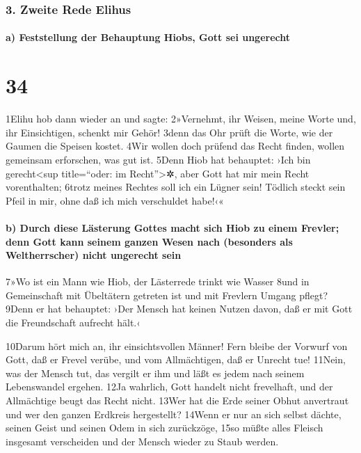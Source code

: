\hypertarget{zweite-rede-elihus}{%
\subsubsection{3. Zweite Rede Elihus}\label{zweite-rede-elihus}}

\hypertarget{a-feststellung-der-behauptung-hiobs-gott-sei-ungerecht}{%
\paragraph{a) Feststellung der Behauptung Hiobs, Gott sei
ungerecht}\label{a-feststellung-der-behauptung-hiobs-gott-sei-ungerecht}}

\hypertarget{section-33}{%
\section{34}\label{section-33}}

1Elihu hob dann wieder an und sagte: 2»Vernehmt, ihr Weisen, meine Worte
und, ihr Einsichtigen, schenkt mir Gehör! 3denn das Ohr prüft die Worte,
wie der Gaumen die Speisen kostet. 4Wir wollen doch prüfend das Recht
finden, wollen gemeinsam erforschen, was gut ist. 5Denn Hiob hat
behauptet: ›Ich bin gerecht\textless sup title=``oder: im
Recht''\textgreater✲, aber Gott hat mir mein Recht vorenthalten; 6trotz
meines Rechtes soll ich ein Lügner sein! Tödlich steckt sein Pfeil in
mir, ohne daß ich mich verschuldet habe!‹«

\hypertarget{b-durch-diese-luxe4sterung-gottes-macht-sich-hiob-zu-einem-frevler-denn-gott-kann-seinem-ganzen-wesen-nach-besonders-als-weltherrscher-nicht-ungerecht-sein}{%
\paragraph{b) Durch diese Lästerung Gottes macht sich Hiob zu einem
Frevler; denn Gott kann seinem ganzen Wesen nach (besonders als
Weltherrscher) nicht ungerecht
sein}\label{b-durch-diese-luxe4sterung-gottes-macht-sich-hiob-zu-einem-frevler-denn-gott-kann-seinem-ganzen-wesen-nach-besonders-als-weltherrscher-nicht-ungerecht-sein}}

7»Wo ist ein Mann wie Hiob, der Lästerrede trinkt wie Wasser 8und in
Gemeinschaft mit Übeltätern getreten ist und mit Frevlern Umgang pflegt?
9Denn er hat behauptet: ›Der Mensch hat keinen Nutzen davon, daß er mit
Gott die Freundschaft aufrecht hält.‹

10Darum hört mich an, ihr einsichtsvollen Männer! Fern bleibe der
Vorwurf von Gott, daß er Frevel verübe, und vom Allmächtigen, daß er
Unrecht tue! 11Nein, was der Mensch tut, das vergilt er ihm und läßt es
jedem nach seinem Lebenswandel ergehen. 12Ja wahrlich, Gott handelt
nicht frevelhaft, und der Allmächtige beugt das Recht nicht. 13Wer hat
die Erde seiner Obhut anvertraut und wer den ganzen Erdkreis
hergestellt? 14Wenn er nur an sich selbst dächte, seinen Geist und
seinen Odem in sich zurückzöge, 15so müßte alles Fleisch insgesamt
verscheiden und der Mensch wieder zu Staub werden.

